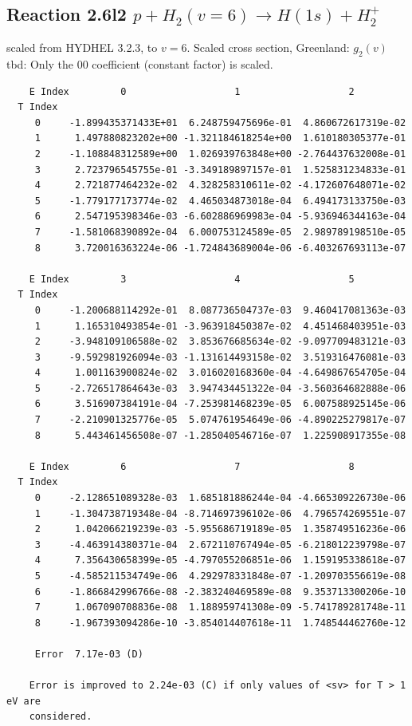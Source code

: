 \documentclass[12pt,dvipdfmx]{article}
\begin{document}
\subsection{
Reaction 2.6l2 $   p + H_2(v=6) \rightarrow H(1s) + H_2^+$}
scaled from HYDHEL 3.2.3, to $v=6$. Scaled cross section, Greenland: $g_2(v)$
tbd:
Only the 00 coefficient (constant factor) is scaled.


\begin{small}\begin{verbatim}
    E Index         0                   1                   2
  T Index
     0     -1.899435371433E+01  6.248759475696e-01  4.860672617319e-02
     1      1.497880823202e+00 -1.321184618254e+00  1.610180305377e-01
     2     -1.108848312589e+00  1.026939763848e+00 -2.764437632008e-01
     3      2.723796545755e-01 -3.349189897157e-01  1.525831234833e-01
     4      2.721877464232e-02  4.328258310611e-02 -4.172607648071e-02
     5     -1.779177173774e-02  4.465034873018e-04  6.494173133750e-03
     6      2.547195398346e-03 -6.602886969983e-04 -5.936946344163e-04
     7     -1.581068390892e-04  6.000753124589e-05  2.989789198510e-05
     8      3.720016363224e-06 -1.724843689004e-06 -6.403267693113e-07

    E Index         3                   4                   5
  T Index
     0     -1.200688114292e-01  8.087736504737e-03  9.460417081363e-03
     1      1.165310493854e-01 -3.963918450387e-02  4.451468403951e-03
     2     -3.948109106588e-02  3.853676685634e-02 -9.097709483121e-03
     3     -9.592981926094e-03 -1.131614493158e-02  3.519316476081e-03
     4      1.001163900824e-02  3.016020168360e-04 -4.649867654705e-04
     5     -2.726517864643e-03  3.947434451322e-04 -3.560364682888e-06
     6      3.516907384191e-04 -7.253981468239e-05  6.007588925145e-06
     7     -2.210901325776e-05  5.074761954649e-06 -4.890225279817e-07
     8      5.443461456508e-07 -1.285040546716e-07  1.225908917355e-08

    E Index         6                   7                   8
  T Index
     0     -2.128651089328e-03  1.685181886244e-04 -4.665309226730e-06
     1     -1.304738719348e-04 -8.714697396102e-06  4.796574269551e-07
     2      1.042066219239e-03 -5.955686719189e-05  1.358749516236e-06
     3     -4.463914380371e-04  2.672110767494e-05 -6.218012239798e-07
     4      7.356430658399e-05 -4.797055206851e-06  1.159195338618e-07
     5     -4.585211534749e-06  4.292978331848e-07 -1.209703556619e-08
     6     -1.866842996766e-08 -2.383240469589e-08  9.353713300206e-10
     7      1.067090708836e-08  1.188959741308e-09 -5.741789281748e-11
     8     -1.967393094286e-10 -3.854014407618e-11  1.748544462760e-12

     Error  7.17e-03 (D)

    Error is improved to 2.24e-03 (C) if only values of <sv> for T > 1 eV are
    considered.
\end{verbatim}\end{small}
\newpage
\end{document}
